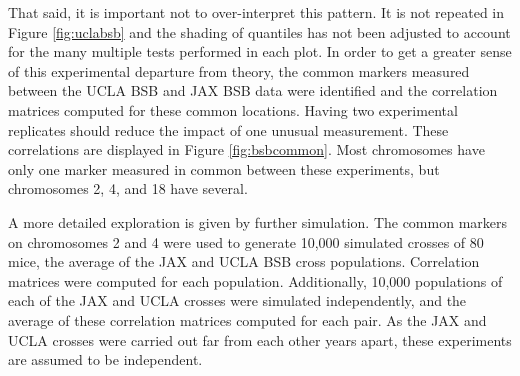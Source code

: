 \documentclass[sts]{imsart}
\begin{document}
That said, it is important not to over-interpret this pattern. It is not repeated in Figure \ref{fig:uclabsb} and the shading of quantiles has not been adjusted to account for the many multiple tests performed in each plot. In order to get a greater sense of this experimental departure from theory, the common markers measured between the UCLA BSB and JAX BSB data were identified and the correlation matrices computed for these common locations. Having two experimental replicates should reduce the impact of one unusual measurement. These correlations are displayed in Figure \ref{fig:bsbcommon}. Most chromosomes have only one marker measured in common between these experiments, but chromosomes 2, 4, and 18 have several.

A more detailed exploration is given by further simulation. The common markers on chromosomes 2 and 4 were used to generate 10,000 simulated crosses of 80 mice, the average of the JAX and UCLA BSB cross populations. Correlation matrices were computed for each population. Additionally, 10,000 populations of each of the JAX and UCLA crosses were simulated independently, and the average of these correlation matrices computed for each pair. As the JAX and UCLA crosses were carried out far from each other years apart, these experiments are assumed to be independent.
\end{document}
